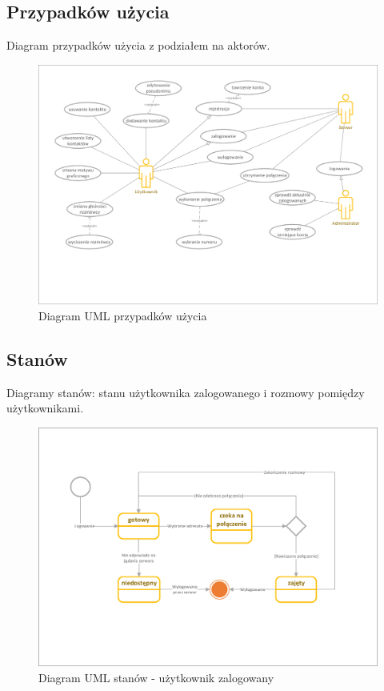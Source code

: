 \documentclass[12pt,a4paper]{article}
\begin{document}
	\subsection{Przypadków użycia}
	\par Diagram przypadków użycia z podziałem na aktorów. 
	\begin{figure}[h!]
		\begin{center}
			\includegraphics*[width=.8\textwidth]{UML_przypadki_uzycia.pdf}
		\end{center}
		\caption{Diagram UML przypadków użycia}
	\end{figure}
	
	\pagebreak
	\subsection{Stanów}
	\par Diagramy stanów: stanu użytkownika zalogowanego i rozmowy pomiędzy użytkownikami.
	\begin{figure}[h!]
		\begin{center}
			\includegraphics*[width=.75\textwidth]{UML_stan_zalogowany.pdf}
		\end{center}
		\caption{Diagram UML stanów - użytkownik zalogowany}
	\end{figure}
\end{document}

